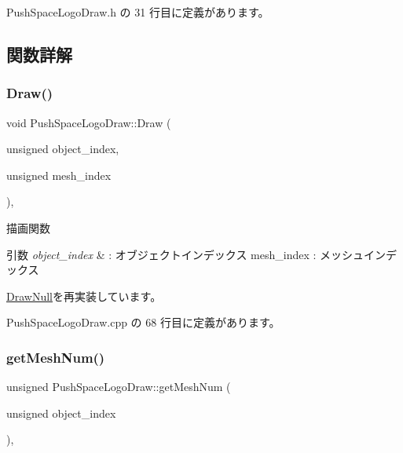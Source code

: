  Push\+Space\+Logo\+Draw.\+h の 31 行目に定義があります。



\subsection{関数詳解}
\mbox{\label{class_push_space_logo_draw_a647dddefc43d66cb3c720ee8fbb6a783}} 
\subsubsection{\texorpdfstring{Draw()}{Draw()}}
{\footnotesize\ttfamily void Push\+Space\+Logo\+Draw\+::\+Draw (\begin{DoxyParamCaption}\item[{unsigned}]{object\+\_\+index,  }\item[{unsigned}]{mesh\+\_\+index }\end{DoxyParamCaption})\hspace{0.3cm}{\ttfamily [override]}, {\ttfamily [virtual]}}



描画関数 


\begin{DoxyParams}{引数}
{\em object\+\_\+index} & \+: オブジェクトインデックス mesh\+\_\+index \+: メッシュインデックス \\
\hline
\end{DoxyParams}


\mbox{\hyperlink{class_draw_null_afe50f6fd820b18d673f70f048743f339}{Draw\+Null}}を再実装しています。



 Push\+Space\+Logo\+Draw.\+cpp の 68 行目に定義があります。

\mbox{\label{class_push_space_logo_draw_abaa66b6e3c46aa03bae21bad271eebc0}} 
\subsubsection{\texorpdfstring{get\+Mesh\+Num()}{getMeshNum()}}
{\footnotesize\ttfamily unsigned Push\+Space\+Logo\+Draw\+::get\+Mesh\+Num (\begin{DoxyParamCaption}\item[{unsigned}]{object\+\_\+index }\end{DoxyParamCaption})\hspace{0.3cm}{\ttfamily [override]}, {\ttfamily [virtual]}}



